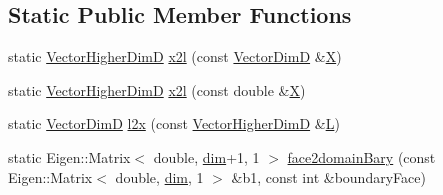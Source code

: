 \subsection*{Static Public Member Functions}
\begin{DoxyCompactItemize}
\item 
static \hyperlink{structmodel_1_1_barycentric_traits_acf017f73aa445c84be0b91d5cdf3d5de}{Vector\+Higher\+Dim\+D} \hyperlink{structmodel_1_1_barycentric_traits_a3ad702ac8741c47470b787c7b5f80b85}{x2l} (const \hyperlink{structmodel_1_1_barycentric_traits_a05149349d869b7dfa9c40be51dce1472}{Vector\+Dim\+D} \&\hyperlink{bench_2dislocation_stress_2plot_stress_8m_ac51b57a703ba1c5869228690c93e1701}{X})
\item 
static \hyperlink{structmodel_1_1_barycentric_traits_acf017f73aa445c84be0b91d5cdf3d5de}{Vector\+Higher\+Dim\+D} \hyperlink{structmodel_1_1_barycentric_traits_abb8632e8cf6a7352945c2c2a3901e444}{x2l} (const double \&\hyperlink{bench_2dislocation_stress_2plot_stress_8m_ac51b57a703ba1c5869228690c93e1701}{X})
\item 
static \hyperlink{structmodel_1_1_barycentric_traits_a05149349d869b7dfa9c40be51dce1472}{Vector\+Dim\+D} \hyperlink{structmodel_1_1_barycentric_traits_a4e1d8f52288fa3ceb5572f283fdf9f6c}{l2x} (const \hyperlink{structmodel_1_1_barycentric_traits_acf017f73aa445c84be0b91d5cdf3d5de}{Vector\+Higher\+Dim\+D} \&\hyperlink{_f_e_m_2linear__elasticity__3d_2tetgen_2generate_s_t_lcube_8m_a6dd34dfb831e5311952faa8c6e2bdab0}{L})
\item 
static Eigen\+::\+Matrix$<$ double, \hyperlink{plot_nd_a_8m_a382f3ca768b275b8d563604f7fc7df73}{dim}+1, 1 $>$ \hyperlink{structmodel_1_1_barycentric_traits_a70c33373901606c6e63f730b4a26b54e}{face2domain\+Bary} (const Eigen\+::\+Matrix$<$ double, \hyperlink{plot_nd_a_8m_a382f3ca768b275b8d563604f7fc7df73}{dim}, 1 $>$ \&b1, const int \&boundary\+Face)
\end{DoxyCompactItemize}

